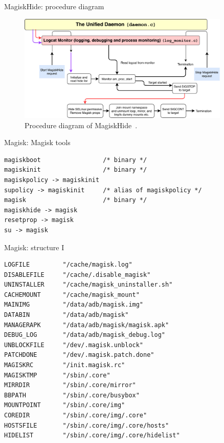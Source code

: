 \documentclass[
    11pt,%
    aspectratio=169,%
]{beamer}
\begin{document}
\begin{frame}{MagiskHide: procedure diagram}
\begin{figure}
	\centering
	\includegraphics[width=0.9\textwidth]{img/magisk_hide}
	\caption{Procedure diagram of MagiskHide~\cite{magisk_documentation}.}
	\label{fig:magisk_hide}
\end{figure}
\end{frame}


\begin{frame}[fragile]{Magisk: Magisk tools}
\begin{verbatim}
magiskboot                 /* binary */
magiskinit                 /* binary */
magiskpolicy -> magiskinit
supolicy -> magiskinit     /* alias of magiskpolicy */
magisk                     /* binary */
magiskhide -> magisk
resetprop -> magisk
su -> magisk
\end{verbatim}
\end{frame}


\begin{frame}[fragile]{Magisk: structure I}
\begin{verbatim}
LOGFILE         "/cache/magisk.log"
DISABLEFILE     "/cache/.disable_magisk"
UNINSTALLER     "/cache/magisk_uninstaller.sh"
CACHEMOUNT      "/cache/magisk_mount"
MAINIMG         "/data/adb/magisk.img"
DATABIN         "/data/adb/magisk"
MANAGERAPK      "/data/adb/magisk/magisk.apk"
DEBUG_LOG       "/data/adb/magisk_debug.log"
UNBLOCKFILE     "/dev/.magisk.unblock"
PATCHDONE       "/dev/.magisk.patch.done"
MAGISKRC        "/init.magisk.rc"
MAGISKTMP       "/sbin/.core"
MIRRDIR         "/sbin/.core/mirror"
BBPATH          "/sbin/.core/busybox"
MOUNTPOINT      "/sbin/.core/img"
COREDIR         "/sbin/.core/img/.core"
HOSTSFILE       "/sbin/.core/img/.core/hosts"
HIDELIST        "/sbin/.core/img/.core/hidelist"
\end{verbatim}
\end{frame}
\end{document}
